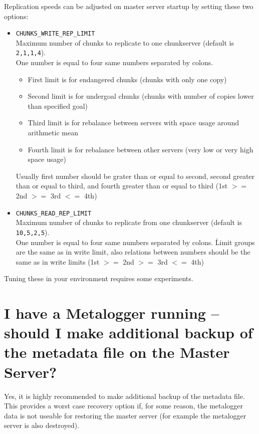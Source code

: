 \documentclass[a4paper,11pt,english]{report}
\def\code#1{\texttt{#1}}
\begin{document}
		Replication speeds can be adjusted on master server startup by setting these two options:
		\begin{itemize}
		
			\item \code{CHUNKS\_WRITE\_REP\_LIMIT} \\
			Maximum number of chunks to replicate to one chunkserver (default is \code{2,1,1,4}). \\
			One number is equal to four same numbers separated by colons.
			\begin{itemize}
				\item First limit is for endangered chunks (chunks with only one copy)
				\item Second limit is for undergoal chunks (chunks with number of copies lower than specified goal)
				\item Third limit is for rebalance between servers with space usage around arithmetic mean
				\item Fourth limit is for rebalance between other servers (very low or very high space usage)
			\end{itemize}
			Usually first number should be grater than or equal to second, second greater than or equal to third, and fourth greater than or equal to third (1st $>=$ 2nd $>=$ 3rd $<=$ 4th)
			
			\item \code{CHUNKS\_READ\_REP\_LIMIT} \\
			Maximum number of chunks to replicate from one chunkserver (default is \code{10,5,2,5}). \\
			One number is equal to four same numbers separated by colons. \'
			Limit groups are the same as in write limit, also relations between numbers should be the same as in write limits (1st $>=$ 2nd $>=$ 3rd $<=$ 4th)
			
		\end{itemize}
		Tuning these in your environment requires some experiments.
		 
		\section{I have a Metalogger running -- should I make additional backup of the metadata file on the Master Server?}
		Yes, it is highly recommended to make additional backup of the metadata file. This provides a worst case recovery option if, for some reason, the metalogger data is not useable for restoring the master server (for example the metalogger server is also destroyed).
		
\end{document}

